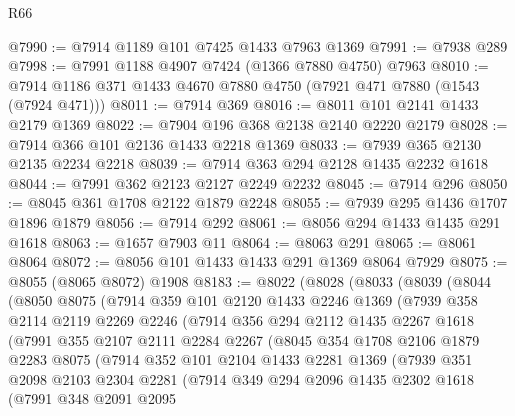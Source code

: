 \begin{lexlean}{R66}
\begin{coremodule}
@7990 := @7914 @1189 @101 @7425 @1433 @7963 @1369
@7991 := @7938 @289
@7998 := @7991 @1188 @4907 @7424 (@1366 @7880 @4750) @7963
@8010 := @7914 @1186 @371 @1433 @4670 @7880 @4750 (@7921 @471 @7880 (@1543 (@7924 @471)))
@8011 := @7914 @369
@8016 := @8011 @101 @2141 @1433 @2179 @1369
@8022 := @7904 @196 @368 @2138 @2140 @2220 @2179
@8028 := @7914 @366 @101 @2136 @1433 @2218 @1369
@8033 := @7939 @365 @2130 @2135 @2234 @2218
@8039 := @7914 @363 @294 @2128 @1435 @2232 @1618
@8044 := @7991 @362 @2123 @2127 @2249 @2232
@8045 := @7914 @296
@8050 := @8045 @361 @1708 @2122 @1879 @2248
@8055 := @7939 @295 @1436 @1707 @1896 @1879
@8056 := @7914 @292
@8061 := @8056 @294 @1433 @1435 @291 @1618
@8063 := @1657 @7903 @11
@8064 := @8063 @291
@8065 := @8061 @8064
@8072 := @8056 @101 @1433 @1433 @291 @1369 @8064 @7929
@8075 := @8055 (@8065 @8072) @1908
@8183 := @8022
    (@8028
      (@8033
        (@8039
          (@8044
            (@8050
              @8075
              (@7914
                @359
                @101
                @2120
                @1433
                @2246
                @1369
                (@7939
                  @358
                  @2114
                  @2119
                  @2269
                  @2246
                  (@7914
                    @356
                    @294
                    @2112
                    @1435
                    @2267
                    @1618
                    (@7991
                      @355
                      @2107
                      @2111
                      @2284
                      @2267
                      (@8045
                        @354
                        @1708
                        @2106
                        @1879
                        @2283
                        @8075
                        (@7914
                          @352
                          @101
                          @2104
                          @1433
                          @2281
                          @1369
                          (@7939
                            @351
                            @2098
                            @2103
                            @2304
                            @2281
                            (@7914
                              @349
                              @294
                              @2096
                              @1435
                              @2302
                              @1618
                              (@7991
                                @348
                                @2091
                                @2095

\end{coremodule}
\end{lexlean}
